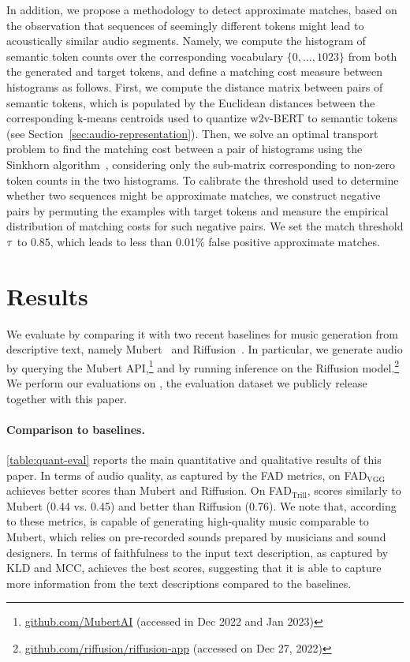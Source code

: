 In addition, we propose a methodology to detect approximate matches, based on the observation that sequences of seemingly different tokens might lead to acoustically similar audio segments. Namely, we compute the histogram of semantic token counts over the corresponding vocabulary $\{0,\ldots,1023\}$ from both the generated and target tokens, and define a matching cost measure between histograms as follows. First, we compute the distance matrix between pairs of semantic tokens, which is populated by the Euclidean distances between the corresponding k-means centroids used to quantize w2v-BERT to semantic tokens (see Section~\ref{sec:audio-representation}). Then, we solve an optimal transport problem to find the matching cost between a pair of histograms using the  Sinkhorn algorithm~\cite{sinkhorn}, considering only the sub-matrix corresponding to non-zero token counts in the two histograms. To calibrate the threshold used to determine whether two sequences might be approximate matches, we construct negative pairs by permuting the examples with target tokens and measure the empirical distribution of matching costs for such negative pairs. We set the match threshold $\tau$ to $0.85$, which leads to less than 0.01\% false positive approximate matches. 
\section{Results}
\label{results}

We evaluate {\model} by comparing it with two recent baselines for music generation from descriptive text, namely Mubert~\cite{Mubert} and Riffusion~\cite{riffusion}. 
In particular, we generate audio by querying the Mubert API,\footnote{\href{https://github.com/MubertAI}{github.com/MubertAI} (accessed in Dec 2022 and Jan 2023)} and by running inference on the Riffusion model.\footnote{\href{https://github.com/riffusion/riffusion-app}{github.com/riffusion/riffusion-app} (accessed on Dec 27, 2022)}
We perform our evaluations on {\dataset}, the evaluation dataset we publicly release together with this paper.

\paragraph{Comparison to baselines.}
\label{results/comparison}

\cref{table:quant-eval} reports the main quantitative and qualitative results of this paper. In terms of audio quality, as captured by the FAD metrics, on FAD$_{\text{VGG}}$ {\model} achieves better scores than Mubert and Riffusion. On FAD$_{\text{Trill}}$, {\model} scores similarly to Mubert (0.44 vs. 0.45) and better than Riffusion (0.76).
We note that, according to these metrics, {\model} is capable of generating high-quality music comparable to Mubert, which relies on pre-recorded sounds prepared by musicians and sound designers.
In terms of faithfulness to the input text description, as captured by KLD and MCC, {\model} achieves the best scores, suggesting that it is able to capture more information from the text descriptions compared to the baselines.

